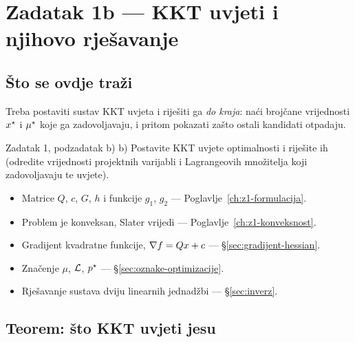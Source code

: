 \chapter{Zadatak 1b --- KKT uvjeti i njihovo rješavanje}
\label{ch:z1-kkt}

\section{Što se ovdje traži}

Treba postaviti sustav KKT uvjeta i riješiti ga \emph{do kraja}: naći brojčane
vrijednosti $x^{\star}$ i $\mu^{\star}$ koje ga zadovoljavaju, i pritom pokazati zašto
ostali kandidati otpadaju.

\begin{zadatak}{Zadatak 1, podzadatak b)}
b) Postavite KKT uvjete optimalnosti i riješite ih (odredite vrijednosti
projektnih varijabli i Lagrangeovih množitelja koji zadovoljavaju te uvjete).
\end{zadatak}

\begin{predznanje}
\begin{itemize}[nosep,leftmargin=*]
  \item Matrice $Q$, $c$, $G$, $h$ i funkcije $g_1$, $g_2$ --- Poglavlje~\ref{ch:z1-formulacija}.
  \item Problem je konveksan, Slater vrijedi --- Poglavlje~\ref{ch:z1-konveksnost}.
  \item Gradijent kvadratne funkcije, $\nabla f = Qx + c$ --- \S\ref{sec:gradijent-hessian}.
  \item Značenje $\mu$, $\mathcal{L}$, $p^{\star}$ --- \S\ref{sec:oznake-optimizacije}.
  \item Rješavanje sustava dviju linearnih jednadžbi --- \S\ref{sec:inverz}.
\end{itemize}
\end{predznanje}

\section{Teorem: što KKT uvjeti jesu}
\label{sec:z1b-teorem}

